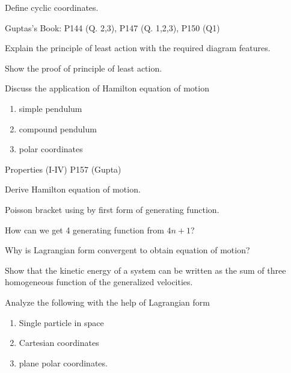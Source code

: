 \documentclass[12pt]{article}
\begin{document}
\begin{prob}
    Define cyclic coordinates.
\end{prob}
\begin{prob}
    Guptas's Book: P144 (Q. 2,3), P147 (Q. 1,2,3), P150 (Q1)
\end{prob}
\begin{prob}
    Explain the principle of least action with the required diagram features.
\end{prob}
\begin{prob}
    Show the proof of principle of least action.
\end{prob}
\begin{prob}
    Discuss the application of Hamilton equation of motion \begin{enumerate}[label=(\roman*)]
        \item simple pendulum
        \item compound pendulum
        \item polar coordinates
    \end{enumerate}
\end{prob}
\begin{prob}
    Properties (I-IV) P157 (Gupta)
\end{prob}
\begin{prob}
    Derive Hamilton equation of motion.
\end{prob}
\begin{prob}
    Poisson bracket using by first form of generating function.
\end{prob}
\begin{prob}
    How can we get 4 generating function from \(4n+1\)?
\end{prob}
\begin{prob}
    Why is Lagrangian form convergent to obtain equation of motion?
\end{prob}
\begin{prob}
    Show that the kinetic energy of a system can be written as the sum of three homogeneous function of the generalized velocities.
\end{prob}
\begin{prob}
    Analyze the following with the help of Lagrangian form 
    \begin{enumerate}[label=(\roman*)]
        \item Single particle in space
        \item Cartesian coordinates
        \item plane polar coordinates.
    \end{enumerate}
\end{prob}
\end{document}
